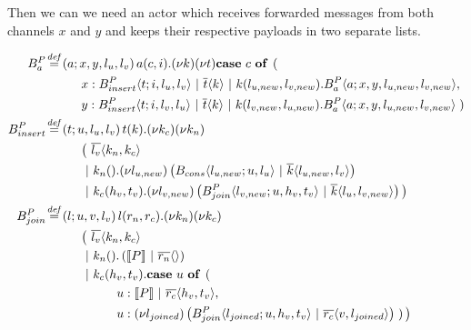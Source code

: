 Then we can we need an actor
which receives forwarded messages from both channels $x$ and $y$
and keeps their respective payloads in two separate lists.





\begin{align*}
  \adef*{B_a^P}{a}{x,y,l_u,l_v}{
    \arcv{a}{c,i} . \anew{k}{\anew{t}{
      \acse{c}{ \right. \nonumber \\
        & \hspace{1cm}
          \aalt{x}{\ains{B_{insert}^P}{t}{i, l_u, l_v} \apar \asnd{t}{k} \apar \arcv{k}{l_{u,new},l_{v,new}} . \ains{B_a^P}{a}{x, y, l_{u,new}, l_{v,new}}}, \nonumber \\
        & \hspace{1cm}
          \aalt{y}{\ains{B_{insert}^P}{t}{i, l_v, l_u} \apar \asnd{t}{k} \apar \arcv{k}{l_{v,new},l_{u,new}} . \ains{B_a^P}{a}{x, y, l_{u,new}, l_{v,new}}}
    \left.}}}
  } \\
  \adef*{B_{insert}^P}{t}{u,l_u,l_v}{
    \arcv{t}{k} . \anew{k_c}{\anew{k_n}{ \nonumber \\
      & \hspace{1cm}
        \big(\ \asnd{l_v}{k_n,k_c} \nonumber \\
      & \hspace{1cm}
        \apar \arcv{k_n}{} . \anew{l_{u,new}}{\parens{\ains{B_{cons}}{l_{u,new}}{u, l_u} \apar \asnd{k}{l_{u,new},l_v}}} \nonumber \\
      & \hspace{1cm}
        \apar \arcv{k_c}{h_v,t_v} . \anew{l_{v,new}}{\parens{\ains{B_{join}^P}{l_{v,new}}{u, h_v, t_v} \apar \asnd{k}{l_u,l_{v,new}}}} \big)
    }}
  } \\
  \adef*{B_{join}^P}{l}{u,v,l_v}{
    \arcv{l}{r_n,r_c} . \anew{k_n}{\anew{k_c}{ \nonumber \\
      & \hspace{1cm}
        \big(\ \asnd{l_v}{k_n,k_c} \nonumber \\
      & \hspace{1cm}
        \apar \arcv{k_n}{} . \parens{\encMJtoAP{P} \apar \asnd{r_n}{}} \nonumber \\
      & \hspace{1cm}
        \apar \arcv{k_c}{h_v,t_v} . \acse{u}{ \right. \nonumber \\
          & \hspace{2cm}
            \aalt{u}{\encMJtoAP{P} \apar \asnd{r_c}{h_v,t_v}}, \nonumber \\
          & \hspace{2cm}
            \aalt{u}{\anew{l_{joined}}{\parens{\ains{B_{join}^P}{l_{joined}}{u, h_v, t_v} \apar \asnd{r_c}{v,l_{joined}}}}}
        \left.}\big)
    }}
  }
\end{align*}

